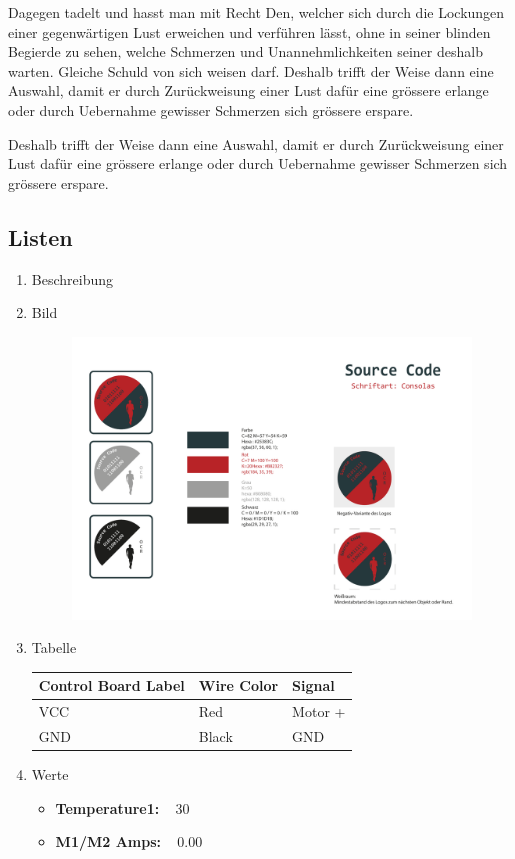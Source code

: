 Dagegen tadelt und hasst man mit Recht Den, welcher sich durch die Lockungen einer gegenwärtigen Lust erweichen und verführen lässt, ohne in seiner blinden Begierde zu sehen, welche Schmerzen und Unannehmlichkeiten seiner deshalb warten. Gleiche Schuld  von sich weisen darf. Deshalb trifft der Weise dann eine Auswahl, damit er durch Zurückweisung einer Lust dafür eine grössere erlange oder durch Uebernahme gewisser Schmerzen sich grössere erspare. 

\noindent Deshalb trifft der Weise dann eine Auswahl, damit er durch Zurückweisung einer Lust dafür eine grössere erlange oder durch Uebernahme gewisser Schmerzen sich grössere erspare. 

\subsection{Listen}
\label{listen}
\begin{enumerate}
	\item Beschreibung
	\item Bild
	
	\begin{figure}[H]
 		\centering
		\includegraphics[width=.55\textwidth]{content/bsp/Logo-Details.pdf}
	\end{figure}

	\item Tabelle
	\newline 
	
	\begin{centering}
		\begin{tabular}[3] {| l | l | l |}
			\hline
			\textbf{Control Board Label} & \textbf{Wire Color} & \textbf{Signal} \\ \hline
			VCC & Red & Motor + \\ \hline
			GND & Black & GND \\ \hline
		\end{tabular} 	
	\end{centering}

	\item Werte

	\begin{itemize}
		\item \textbf{Temperature1:} ~ 30
		\item \textbf{M1/M2 Amps:} ~ 0.00
	\end{itemize}

\end{enumerate}

